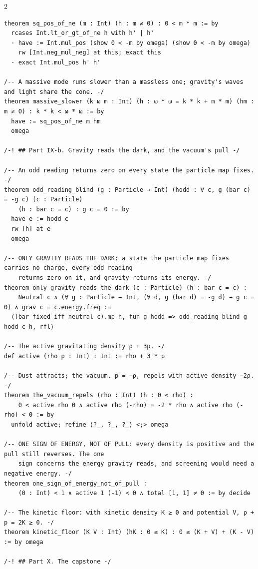 \documentclass[10pt]{article}
\begin{document}
\begin{multicols}{2}
\begin{Verbatim}[fontsize=\fontsize{5.9}{6.8}\selectfont,breaklines,breakanywhere,breaksymbolleft={}]
theorem sq_pos_of_ne (m : Int) (h : m ≠ 0) : 0 < m * m := by
  rcases Int.lt_or_gt_of_ne h with h' | h'
  · have := Int.mul_pos (show 0 < -m by omega) (show 0 < -m by omega)
    rw [Int.neg_mul_neg] at this; exact this
  · exact Int.mul_pos h' h'

/-- A massive mode runs slower than a massless one; gravity's waves and light share the cone. -/
theorem massive_slower (k ω m : Int) (h : ω * ω = k * k + m * m) (hm : m ≠ 0) : k * k < ω * ω := by
  have := sq_pos_of_ne m hm
  omega

/-! ## Part IX-b. Gravity reads the dark, and the vacuum's pull -/

/-- An odd reading returns zero on every state the particle map fixes. -/
theorem odd_reading_blind (g : Particle → Int) (hodd : ∀ c, g (bar c) = -g c) (c : Particle)
    (h : bar c = c) : g c = 0 := by
  have e := hodd c
  rw [h] at e
  omega

/-- ONLY GRAVITY READS THE DARK: a state the particle map fixes carries no charge, every odd reading
    returns zero on it, and gravity returns its energy. -/
theorem only_gravity_reads_the_dark (c : Particle) (h : bar c = c) :
    Neutral c ∧ (∀ g : Particle → Int, (∀ d, g (bar d) = -g d) → g c = 0) ∧ grav c = c.energy.freq :=
  ⟨(bar_fixed_iff_neutral c).mp h, fun g hodd => odd_reading_blind g hodd c h, rfl⟩

/-- The active gravitating density ρ + 3p. -/
def active (rho p : Int) : Int := rho + 3 * p

/-- Dust attracts; the vacuum, p = −ρ, repels with active density −2ρ. -/
theorem the_vacuum_repels (rho : Int) (h : 0 < rho) :
    0 < active rho 0 ∧ active rho (-rho) = -2 * rho ∧ active rho (-rho) < 0 := by
  unfold active; refine ⟨?_, ?_, ?_⟩ <;> omega

/-- ONE SIGN OF ENERGY, NOT OF PULL: every density is positive and the pull still reverses. The one
    sign concerns the energy gravity reads, and screening would need a negative energy. -/
theorem one_sign_of_energy_not_of_pull :
    (0 : Int) < 1 ∧ active 1 (-1) < 0 ∧ total [1, 1] ≠ 0 := by decide

/-- The kinetic floor: with kinetic density K ≥ 0 and potential V, ρ + p = 2K ≥ 0. -/
theorem kinetic_floor (K V : Int) (hK : 0 ≤ K) : 0 ≤ (K + V) + (K - V) := by omega

/-! ## Part X. The capstone -/


\end{Verbatim}
\end{multicols}
\end{document}
